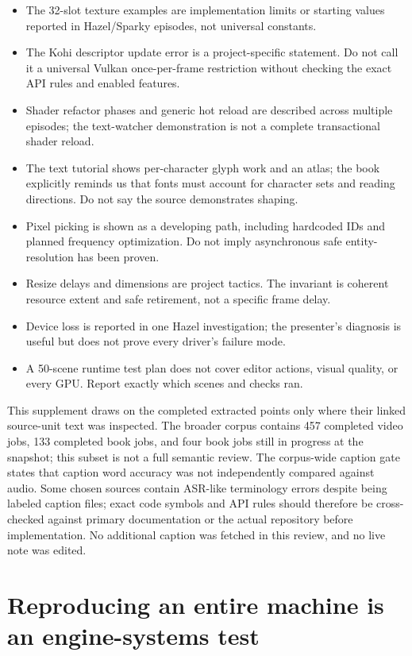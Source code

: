 \begin{itemize}
\tightlist
\item
  The 32-slot texture examples are implementation limits or starting values reported in Hazel/Sparky episodes, not universal constants.
\item
  The Kohi descriptor update error is a project-specific statement. Do not call it a universal Vulkan once-per-frame restriction without checking the exact API rules and enabled features.
\item
  Shader refactor phases and generic hot reload are described across multiple episodes; the text-watcher demonstration is not a complete transactional shader reload.
\item
  The text tutorial shows per-character glyph work and an atlas; the book explicitly reminds us that fonts must account for character sets and reading directions. Do not say the source demonstrates shaping.
\item
  Pixel picking is shown as a developing path, including hardcoded IDs and planned frequency optimization. Do not imply asynchronous safe entity-resolution has been proven.
\item
  Resize delays and dimensions are project tactics. The invariant is coherent resource extent and safe retirement, not a specific frame delay.
\item
  Device loss is reported in one Hazel investigation; the presenter's diagnosis is useful but does not prove every driver's failure mode.
\item
  A 50-scene runtime test plan does not cover editor actions, visual quality, or every GPU. Report exactly which scenes and checks ran.
\end{itemize}

This supplement draws on the completed extracted points only where their linked source-unit text was inspected. The broader corpus contains 457 completed video jobs, 133 completed book jobs, and four book jobs still in progress at the snapshot; this subset is not a full semantic review. The corpus-wide caption gate states that caption word accuracy was not independently compared against audio. Some chosen sources contain ASR-like terminology errors despite being labeled caption files; exact code symbols and API rules should therefore be cross-checked against primary documentation or the actual repository before implementation. No additional caption was fetched in this review, and no live note was edited.

\section{Reproducing an entire machine is an engine-systems test}\label{06-engine-ii-ch041-reproducing-an-entire-machine-is-an-engine-systems-test}

